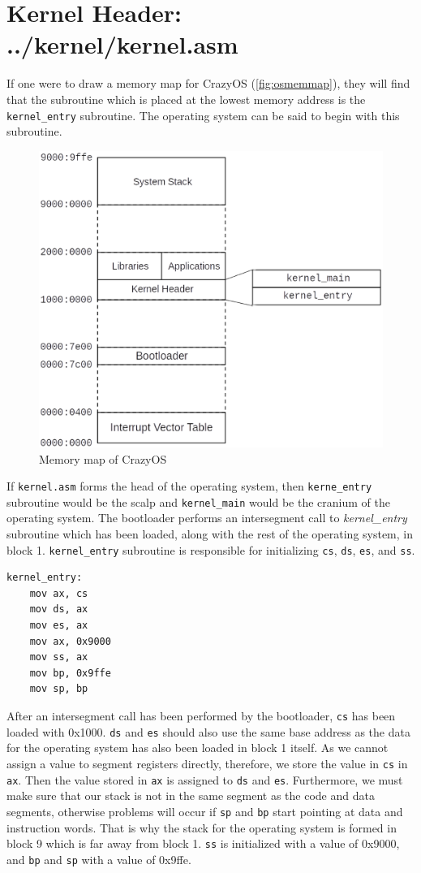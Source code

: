 \section{Kernel Header: ../kernel/kernel.asm}
If one were to draw a memory map for CrazyOS (\autoref{fig:osmemmap}), they will find that the subroutine which is placed at the lowest memory address is the \texttt{kernel\_entry} subroutine. The operating system can be said to begin with this subroutine.
\begin{figure}[h]
  \centering
  \includegraphics[scale=0.25]{figures/osmemmap.eps}
  \caption{Memory map of CrazyOS}
\label{fig:osmemmap}
\end{figure}
If \texttt{kernel.asm} forms the head of the operating system, then \texttt{kerne\_entry} subroutine would be the scalp and \texttt{kernel\_main} would be the cranium of the operating system. The bootloader performs an intersegment call to \textit{kernel\_entry} subroutine which has been loaded, along with the rest of the operating system, in block 1. \texttt{kernel\_entry} subroutine is responsible for initializing \texttt{cs}, \texttt{ds}, \texttt{es}, and \texttt{ss}.
\begin{Verbatim}
kernel_entry:
	mov ax, cs
	mov ds, ax
	mov es, ax
	mov ax, 0x9000
	mov ss, ax
	mov bp, 0x9ffe
	mov sp, bp
\end{Verbatim}
After an intersegment call has been performed by the bootloader, \texttt{cs} has been loaded with 0x1000. \verb|ds| and \verb|es| should also use the same base address as the data for the operating system has also been loaded in block 1 itself. As we cannot assign a value to segment registers directly, therefore, we store the value in \verb|cs| in \verb|ax|. Then the value stored in \verb|ax| is assigned to \verb|ds| and \verb|es|. Furthermore, we must make sure that our stack is not in the same segment as the code and data segments, otherwise problems will occur if \verb|sp| and \verb|bp| start pointing at data and instruction words. That is why the stack for the operating system is formed in block 9 which is far away from block 1. \verb|ss| is initialized with a value of 0x9000, and \verb|bp| and \verb|sp| with a value of 0x9ffe.\\
